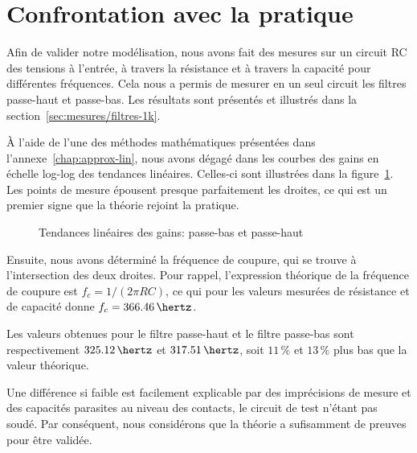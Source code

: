 \section{Confrontation avec la pratique}
\label{sec:filtres/confront}

Afin de valider notre modélisation,
nous avons fait des mesures sur un circuit RC
des tensions à l'entrée, à travers la résistance
et à travers la capacité pour différentes fréquences.
Cela nous a permis de mesurer en un seul circuit
les filtres passe-haut et passe-bas.
Les résultats sont présentés et illustrés
dans la section~\ref{sec:mesures/filtres-1k}.

À l'aide de l'une des méthodes mathématiques présentées dans
l'annexe~\ref{chap:approx-lin},
nous avons dégagé dans les courbes des gains en échelle log-log
des tendances linéaires.
Celles-ci sont illustrées dans la figure~\ref{fig:ph-pb-tendances}.
Les points de mesure épousent presque parfaitement les droites,
ce qui est un premier signe que la théorie rejoint la pratique.

\begin{figure}[h!]
    \centering
    \qquad
    \caption{Tendances linéaires des gains: passe-bas et passe-haut}
    \label{fig:ph-pb-tendances}
\end{figure}

Ensuite, nous avons déterminé la fréquence de coupure,
qui se trouve à l'intersection des deux droites.
Pour rappel, l'expression théorique de la fréquence de coupure est
$f_c=1/(2\pi RC)$, ce qui pour les valeurs mesurées de résistance et
de capacité donne $f_c=366.46\,\hertz$.

Les valeurs obtenues pour le filtre passe-haut et le filtre passe-bas
sont respectivement $325.12\,\hertz$ et $317.51\,\hertz$,
soit $11\,\%$ et $13\,\%$ plus bas que la valeur théorique.

Une différence si faible est facilement explicable par des imprécisions
de mesure et des capacités parasites au niveau des contacts,
le circuit de test n'étant pas soudé.
Par conséquent, nous considérons que la théorie a sufisamment de preuves
pour être validée.
